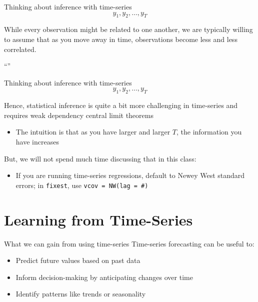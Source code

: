\documentclass[aspectratio=169,t,11pt,table]{beamer}
\begin{document}

\begin{frame}{Thinking about inference with time-series}
  \vspace*{-\bigskipamount}
  $$
    y_1, y_2, \dots, y_T
  $$
  
  \bigskip
  While every observation might be related to one another, we are typically willing to assume that as you move away in time, observations become less and less correlated.
  

  \begin{tcolorbox}[boxrule = 0pt, frame hidden, sharp corners, enhanced, borderline west = {2pt}{0pt}{blue}, interior hidden]
    ``''
  \end{tcolorbox}
\end{frame}

\begin{frame}{Thinking about inference with time-series}
  \vspace*{-\bigskipamount}
  $$
    y_1, y_2, \dots, y_T
  $$
  
  Hence, statistical inference is quite a bit more challenging in time-series and requires weak dependency central limit theorems
  \begin{itemize}
    \item The intuition is that as you have larger and larger $T$, the information you have increases
  \end{itemize}

  \pause
  \bigskip
  But, we will not spend much time discussing that in this class:
  \begin{itemize}
    \item If you are running time-series regressions, default to Newey West standard errors; in \texttt{fixest}, use \texttt{vcov = NW(lag = \#)}
  \end{itemize}
\end{frame}


\section{Learning from Time-Series}

\begin{frame}{What we can gain from using time-series}
  Time-series forecasting can be useful to:
  \begin{itemize}
    \item Predict future values based on past data

    \item Inform decision-making by anticipating changes over time

    \item Identify patterns like trends or seasonality
  \end{itemize}
\end{frame}
\end{document}
